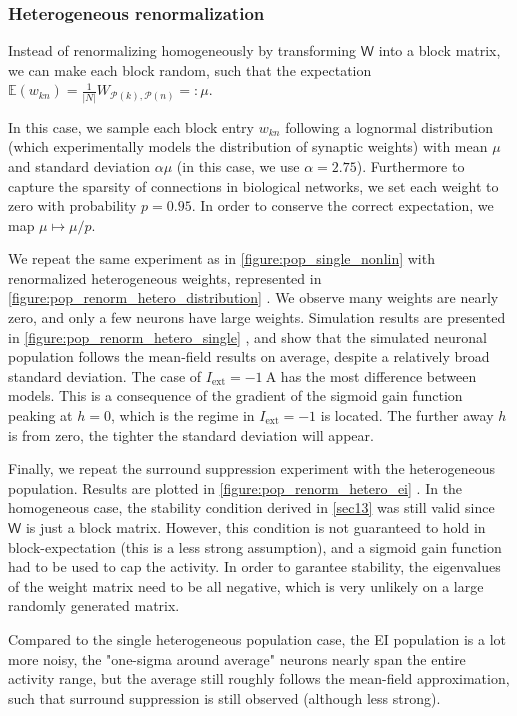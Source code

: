 \documentclass[10pt,conference,compsocconf,a4paper]{IEEEtran}
\newcommand{\nunit}[1]{\ \si{#1}}
\newcommand*{\shortautoref}[1]{%
	\begingroup
	\def\equationautorefname{\textsc{Eq.}}%
	\def\tableautorefname{\textsc{Tab.}}%
	\def\figureautorefname{\textsc{Fig.}}%
	\autoref{#1}%
	\endgroup
}
\begin{document}
		\subsubsection{Heterogeneous renormalization}

			Instead of renormalizing homogeneously by transforming $\mathsf W$ into a block matrix, we can make each block random, such that the expectation $\mathbb E(w_{kn}) = \frac{1}{|N|} W_{\mathcal P(k),\mathcal P(n)} =: \mu$.
			
			In this case, we sample each block entry $w_{kn}$ following a lognormal distribution (which experimentally models the distribution of synaptic weights) with mean $\mu$ and standard deviation $\alpha \mu$ (in this case, we use $\alpha = 2.75$).
			Furthermore to capture the sparsity of connections in biological networks, we set each weight to zero with probability $p=0.95$. In order to conserve the correct expectation, we map $\mu \mapsto \mu/p$.

			We repeat the same experiment as in \shortautoref{figure:pop_single_nonlin} with renormalized heterogeneous weights, represented in \shortautoref{figure:pop_renorm_hetero_distribution}. We observe many weights are nearly zero, and only a few neurons have large weights. Simulation results are presented in \shortautoref{figure:pop_renorm_hetero_single}, and show that the simulated neuronal population follows the mean-field results on average, despite a relatively broad standard deviation. The case of $I_{\text{ext}} = -1 \nunit{\ampere}$ has the most difference between models. This is a consequence of the gradient of the sigmoid gain function peaking at $h = 0$, which is the regime in $I_{\text{ext}} = -1$ is located. The further away $h$ is from zero, the tighter the standard deviation will appear.

			Finally, we repeat the surround suppression experiment with the heterogeneous population. Results are plotted in \shortautoref{figure:pop_renorm_hetero_ei}. In the homogeneous case, the stability condition derived in \shortautoref{sec13} was still valid since $\mathsf W$ is just a block matrix. However, this condition is not guaranteed to hold in block-expectation (this is a less strong assumption), and a sigmoid gain function had to be used to cap the activity. In order to garantee stability, the eigenvalues of the weight matrix need to be all negative, which is very unlikely on a large randomly generated matrix.

			Compared to the single heterogeneous population case, the EI population is a lot more noisy, the "one-sigma around average" neurons nearly span the entire activity range, but the average still roughly follows the mean-field approximation, such that surround suppression is still observed (although less strong).
\end{document}
